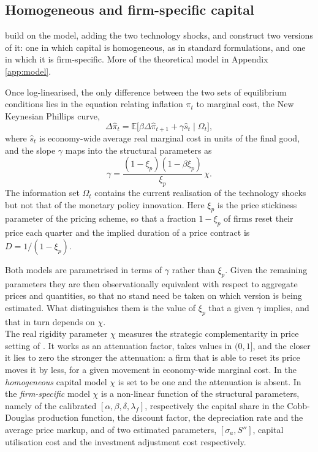 \documentclass[12pt, a4paper]{article}
\begin{document}
\subsection{Homogeneous and firm-specific capital}
\label{sec:2.2homog_bs_firm-spec_capital}

\citet{ACEL2011} build on the \citet{CEE2005} model, adding the two technology shocks, and
construct two versions of it: one in which capital is homogeneous, as in standard
formulations, and one in which it is firm-specific. More of the theoretical model in Appendix \ref{app:model}.

Once log-linearised, the only difference between the two sets of equilibrium conditions lies
in the equation relating inflation $\pi_t$ to marginal cost, the New Keynesian Phillips curve,
\begin{equation}
    \Delta\hat{\pi}_t = \mathbb{E}\bigl[\beta\Delta\hat{\pi}_{t+1} + \gamma\hat{s}_t \mid \Omega_t\bigr],
    \label{eq:phillips}
\end{equation}
where $\hat{s}_t$ is economy-wide average real marginal cost in units of the final good, and
the slope $\gamma$ maps into the structural parameters as
\begin{equation}
    \gamma = \frac{(1-\xi_p)(1-\beta\xi_p)}{\xi_p}\,\chi .
    \label{eq:gamma}
\end{equation}
The information set $\Omega_t$ contains the current realisation of the technology shocks but
not that of the monetary policy innovation. Here $\xi_p$ is the price stickiness parameter of
the \citet{Calvo1983} pricing scheme, so that a fraction $1-\xi_p$ of firms reset their price
each quarter and the implied duration of a price contract is $D = 1/(1-\xi_p)$.

Both models are parametrised in terms of $\gamma$ rather than $\xi_p$. Given the remaining
parameters they are then observationally equivalent with respect to aggregate prices and
quantities, so that no stand need be taken on which version is being estimated. What
distinguishes them is the value of $\xi_p$ that a given $\gamma$ implies, and that in turn
depends on $\chi$.
\\

The real rigidity parameter $\chi$ measures the strategic complementarity in price setting of
\citet{BallRomer1990}. It works as an attenuation factor, takes values in $(0,1]$, and the
closer it lies to zero the stronger the attenuation: a firm that is able to reset its price
moves it by less, for a given movement in economy-wide marginal cost. In the
\textit{homogeneous} capital model $\chi$ is set to be one and the attenuation is absent. In the
\textit{firm-specific} model $\chi$ is a non-linear function of the structural parameters,
namely of the calibrated $[\alpha, \beta, \delta, \lambda_f]$, respectively the capital share
in the Cobb-Douglas production function, the discount factor, the depreciation rate and the
average price markup, and of two estimated parameters, $[\sigma_a, S'']$, 
capital utilisation cost and the investment adjustment cost respectively.
\\
\end{document}

